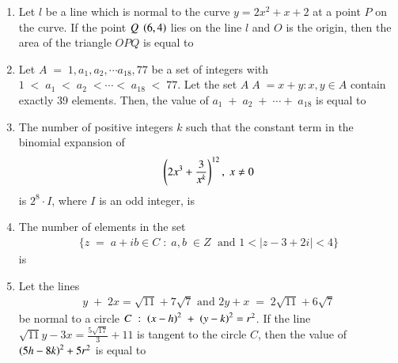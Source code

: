 \documentclass[journal,,12pt,onecolumn]{IEEEtran}
\theoremstyle{remark}
\begin{document}
\begin{enumerate}
 \bigskip
 \item Let $l$ be a line which is normal to the curve $y=2x^2+x+2$ at a point $P$ on the curve. If the point $Q\;\left(6,4\right)$ lies on the line $l$ and $O$ is the origin, then the area of the triangle $OPQ$ is equal to
 \bigskip
 \item Let $A\;=\;{1,a_1,a_2,\cdots a_{18},77}$ be a set of integers with $1\;<\;a_1\;<\;a_2\;<\cdots<\;a_{18}\;<\;77$. Let the set $A\;A\;={x+y:x,y \in A}$ contain exactly 39 elements. Then, the value of $a_1\;+\;a_2\;+\;\cdots+\;a_{18}$ is equal to
 \bigskip
 \item The number of positive integers $k$ such that the constant term in the binomial expansion of
 \begin{align*}
 \left(2x^3+\frac{3}{x^k}\right)^{12},\;x\neq0
 \end{align*}
 is $2^8\cdot I$, where $I$ is an odd integer, is
 \bigskip
 \item The number of elements in the set 
 \begin{align*}
 \{z\;=\;a+ib \in C\; : \; a,b\;\in Z\;\text{ and } 1<|z-3+2i|<4\}
 \end{align*}
 is
 \bigskip
 \item Let the lines 
 \begin{align*}
 y\;+\;2x=\sqrt{11}+7\sqrt{7}\text{ and } 2y+x\;=\;2\sqrt{11}+6\sqrt{7}
 \end{align*}
 be normal to a circle $C\; :\;\left(x-h\right)^2\;+\;\left(y-k\right)^2=r^2$. If the line $\sqrt{11}y-3x=\frac{5\sqrt{17}}{3}+11$ is tangent to the circle $C$, then the value of $\left(5h-8k\right)^2+5r^2$ is equal to
 \end{enumerate}
 
\end{document}
